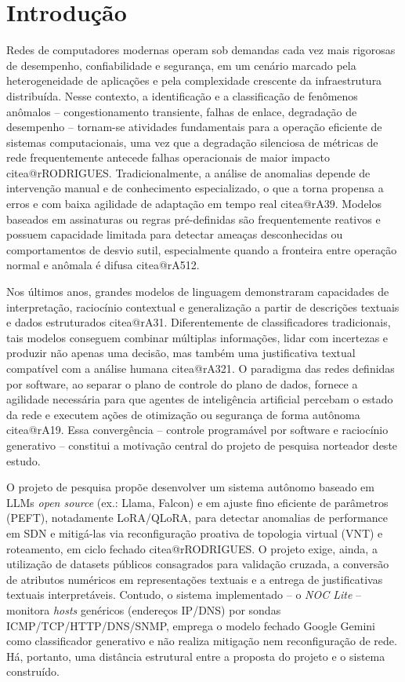 \documentclass[12pt,a4paper]{article}
\makeatletter
\newcommand{\citea}[1]{\begingroup\edef\@currentlabel{\csname citea@#1\endcsname}\@currentlabel\endgroup}
\makeatother
\begin{document}
\section{Introdução}
\label{sec:intro}

Redes de computadores modernas operam sob demandas cada vez mais rigorosas
de desempenho, confiabilidade e segurança, em um cenário marcado pela
heterogeneidade de aplicações e pela complexidade crescente da
infraestrutura distribuída. Nesse contexto, a identificação e a
classificação de fenômenos anômalos -- congestionamento transiente, falhas
de enlace, degradação de desempenho -- tornam-se atividades fundamentais
para a operação eficiente de sistemas computacionais, uma vez que a
degradação silenciosa de métricas de rede frequentemente antecede falhas
operacionais de maior impacto \citea{rRODRIGUES}. Tradicionalmente, a
análise de anomalias depende de intervenção manual e de conhecimento
especializado, o que a torna propensa a erros e com baixa agilidade de
adaptação em tempo real \citea{rA39}. Modelos baseados em assinaturas ou
regras pré-definidas são frequentemente reativos e possuem capacidade
limitada para detectar ameaças desconhecidas ou comportamentos de
desvio sutil, especialmente quando a fronteira entre operação normal e
anômala é difusa \citea{rA512}.

Nos últimos anos, grandes modelos de linguagem demonstraram capacidades de
interpretação, raciocínio contextual e generalização a partir de descrições
textuais e dados estruturados \citea{rA31}. Diferentemente de classificadores
tradicionais, tais modelos conseguem combinar múltiplas informações, lidar
com incertezas e produzir não apenas uma decisão, mas também uma
justificativa textual compatível com a análise humana \citea{rA321}. O
paradigma das redes definidas por software, ao separar o plano de controle do
plano de dados, fornece a agilidade necessária para que agentes de
inteligência artificial percebam o estado da rede e executem ações de
otimização ou segurança de forma autônoma \citea{rA19}. Essa convergência --
controle programável por software e raciocínio generativo -- constitui a
motivação central do projeto de pesquisa norteador deste estudo.

O projeto de pesquisa propõe desenvolver um sistema autônomo baseado em
LLMs \textit{open source} (ex.: Llama, Falcon) e em ajuste fino eficiente de
parâmetros (PEFT), notadamente LoRA/QLoRA, para detectar anomalias de
performance em SDN e mitigá-las via reconfiguração proativa de topologia
virtual (VNT) e roteamento, em ciclo fechado \citea{rRODRIGUES}. O projeto
exige, ainda, a utilização de datasets públicos consagrados para validação
cruzada, a conversão de atributos numéricos em representações textuais e a
entrega de justificativas textuais interpretáveis. Contudo, o sistema
implementado -- o \textit{NOC Lite} -- monitora \textit{hosts} genéricos
(endereços IP/DNS) por sondas ICMP/TCP/HTTP/DNS/SNMP, emprega o modelo
fechado Google Gemini como classificador generativo e não realiza mitigação
nem reconfiguração de rede. Há, portanto, uma distância estrutural entre a
proposta do projeto e o sistema construído.
\end{document}
